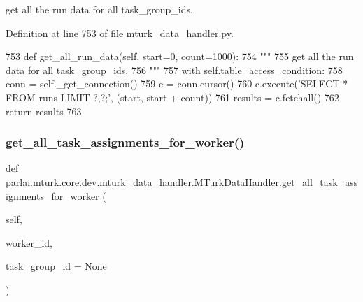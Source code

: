 \begin{DoxyVerb}get all the run data for all task_group_ids.
\end{DoxyVerb}
 

Definition at line 753 of file mturk\+\_\+data\+\_\+handler.\+py.


\begin{DoxyCode}
753     \textcolor{keyword}{def }get\_all\_run\_data(self, start=0, count=1000):
754         \textcolor{stringliteral}{"""}
755 \textcolor{stringliteral}{        get all the run data for all task\_group\_ids.}
756 \textcolor{stringliteral}{        """}
757         with self.table\_access\_condition:
758             conn = self.\_get\_connection()
759             c = conn.cursor()
760             c.execute(\textcolor{stringliteral}{'SELECT * FROM runs LIMIT ?,?;'}, (start, start + count))
761             results = c.fetchall()
762             \textcolor{keywordflow}{return} results
763 
\end{DoxyCode}
\mbox{\label{classparlai_1_1mturk_1_1core_1_1dev_1_1mturk__data__handler_1_1MTurkDataHandler_a7d86983e9f01a1f785284bbda21a2860}} 
\subsubsection{\texorpdfstring{get\+\_\+all\+\_\+task\+\_\+assignments\+\_\+for\+\_\+worker()}{get\_all\_task\_assignments\_for\_worker()}}
{\footnotesize\ttfamily def parlai.\+mturk.\+core.\+dev.\+mturk\+\_\+data\+\_\+handler.\+M\+Turk\+Data\+Handler.\+get\+\_\+all\+\_\+task\+\_\+assignments\+\_\+for\+\_\+worker (\begin{DoxyParamCaption}\item[{}]{self,  }\item[{}]{worker\+\_\+id,  }\item[{}]{task\+\_\+group\+\_\+id = {\ttfamily None} }\end{DoxyParamCaption})}

